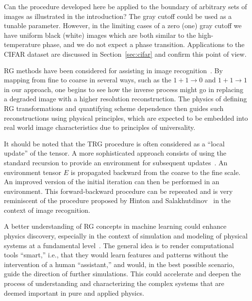 \documentclass[../main.tex]{subfiles}
\begin{document}
Can the procedure developed here be applied to the boundary of arbitrary sets
of images as illustrated in the introduction?  The gray cutoff could be used as
a tunable parameter. However, in the limiting cases of a zero (one) gray cutoff
we have uniform black (white) images which are both similar to the
high-temperature phase, and we do not expect a phase transition.  Applications
to the CIFAR dataset are discussed in Section~\ref{sec:cifar} and confirm this
point of view. 

RG methods have been considered for assisting in image recognition~\cite{16712,
0305-4470-35-37-201,1997PhLA..227..319H}. By mapping from fine to coarse in
several ways, such as the $1 + 1\rightarrow 0$ and $1 + 1\rightarrow 1$ in our
approach, one begins to see how the inverse process might go in replacing a
degraded image with a higher resolution reconstruction. The physics of defining
RG transformations and quantifying scheme dependence then guides such
reconstructions using physical principles, which are expected to be embedded
into real world image characteristics due to principles of universality.

It should be noted that the TRG procedure is often considered as a ``local
update'' of the tensor. A more sophisticated approach consists of using the
standard recursion to provide an environment for subsequent
updates~\cite{PhysRevLett.103.160601,PhysRevB.86.045139}. An environment tensor
$E$ is propagated backward from the coarse to the fine scale. An improved
version of the initial iteration can then be performed in an environment. This
forward-backward procedure can be repeeated and is very reminiscent of the
procedure proposed by Hinton and Salakhutdinov~\cite{Hinton504} in the context
of image recognition.

A better understanding of RG concepts in machine learning could enhance physics
discovery, especially in the context of simulation and modeling of physical
systems at a fundamental level~\cite{Shanahan:2018vcv}.  The general idea is to
render computational tools ``smart,'' i.e., that they would learn features and
patterns without the intervention of a human ``assistant,'' and would, in the
best possible scenario, guide the direction of further simulations. This could
accelerate and deepen the process of understanding and characterizing the
complex systems that are deemed important in pure and applied physics.
\end{document}
